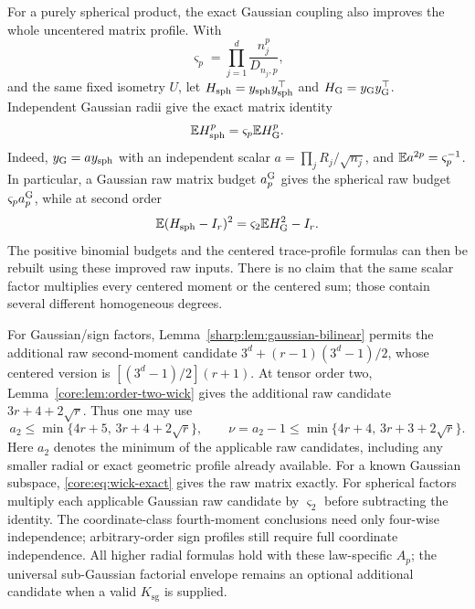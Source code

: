 \documentclass[11pt,a4paper]{article}
\theoremstyle{definition}\newtheorem{definition}[theorem]{Definition}
\theoremstyle{remark}\newtheorem{remark}[theorem]{Remark}
\numberwithin{equation}{section}
\newcommand{\Ksg}{{K_{\mathrm{sg}}}}\newcommand{\Cfour}{{C_4}}
\begin{document}
For a purely spherical product, the exact Gaussian coupling also
improves the whole uncentered matrix profile. With
\begin{equation}\label{core:eq:spherical-beta-profile}
 \varsigma_p=\prod_{j=1}^d\frac{n_j^p}{D_{n_j,p}},
\end{equation}
and the same fixed isometry $U$, let $H_{\rm sph}=y_{\rm sph}
y_{\rm sph}^\top$ and $H_{\rm G}=y_{\rm G}y_{\rm G}^\top$.
Independent Gaussian radii give the exact matrix identity
\begin{equation}\label{core:eq:spherical-matrix-profile}
 \mathbb E H_{\rm sph}^{p}=\varsigma_p\mathbb E H_{\rm G}^{p}.
\end{equation}
Indeed, $y_{\rm G}=a y_{\rm sph}$ with an independent scalar
$a=\prod_jR_j/\sqrt{n_j}$,
and $\mathbb E a^{2p}=\varsigma_p^{-1}$.
In particular, a Gaussian raw matrix budget $a_p^{\rm G}$ gives the
spherical raw budget $\varsigma_pa_p^{\rm G}$, while at second order
\[
 \mathbb E(H_{\rm sph}-I_r)^2
 =\varsigma_2\mathbb E H_{\rm G}^2-I_r.
\]
The positive binomial budgets and the centered trace-profile formulas
can then be rebuilt using these improved raw inputs.
There is no claim that the same scalar factor multiplies every
centered moment or the centered sum; those contain several different
homogeneous degrees.

For Gaussian/sign factors, Lemma~\ref{sharp:lem:gaussian-bilinear}
permits the additional raw second-moment candidate
$3^d+(r-1)(3^d-1)/2$, whose centered version is
$[(3^d-1)/2](r+1)$.
At tensor order two, Lemma~\ref{core:lem:order-two-wick} gives the
additional raw candidate $3r+4+2\sqrt r$. Thus one may use
\[
 a_2\le\min\{4r+5,\,3r+4+2\sqrt r\},\qquad
 \nu=a_2-1\le\min\{4r+4,\,3r+3+2\sqrt r\}.
\]
Here $a_2$ denotes the minimum of the applicable raw candidates,
including any smaller radial or exact geometric profile already
available. For a known Gaussian subspace,
\eqref{core:eq:wick-exact} gives the raw matrix exactly.
For spherical factors multiply each applicable Gaussian raw
candidate by $\varsigma_2$ before subtracting the identity.
The coordinate-class fourth-moment conclusions need only four-wise
independence; arbitrary-order sign profiles still require full
coordinate independence.
All higher radial formulas hold with these law-specific $A_p$;
the universal sub-Gaussian factorial envelope remains an optional
additional candidate when a valid $\Ksg$ is supplied.
\end{document}
